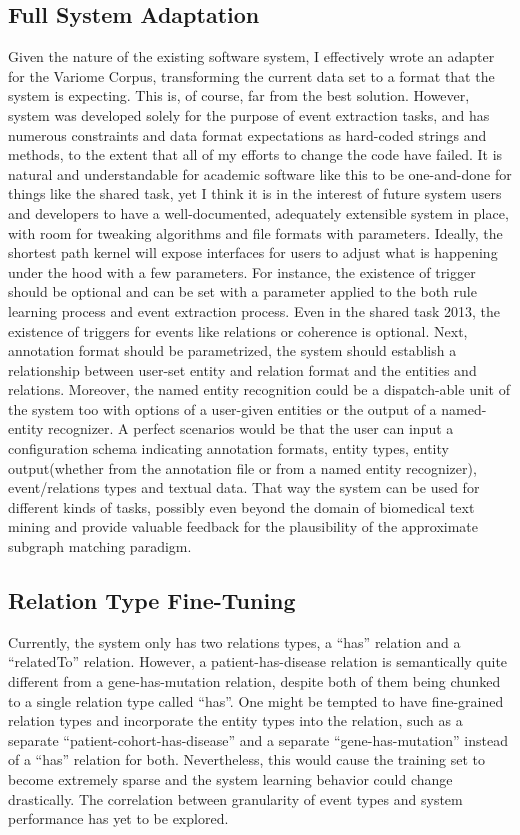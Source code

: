 \subsection{Full System Adaptation}
Given the nature of the existing software system, I effectively wrote an adapter for the Variome Corpus, transforming the current data set to a format that the system is expecting. This is, of course, far from the best solution. However, system was developed solely for the purpose of event extraction tasks, and has numerous constraints and data format expectations as hard-coded strings and methods, to the extent that all of my efforts to change the code have failed. It is natural and understandable for academic software like this to be one-and-done for things like the shared task, yet I think it is in the interest of future system users and developers to have a well-documented, adequately extensible system in place, with room for tweaking algorithms and file formats with parameters. Ideally, the shortest path kernel will expose interfaces for users to adjust what is happening under the hood with a few parameters. For instance, the existence of trigger should be optional and can be set with a parameter applied to the both rule learning process and event extraction process. Even in the shared task 2013, the existence of triggers for events like relations or coherence is optional. Next, annotation format should be parametrized, the system should establish a relationship between user-set entity and relation format and the entities and relations. Moreover, the named entity recognition could be a dispatch-able unit of the system too with options of a user-given entities or the output of a named-entity recognizer. A perfect scenarios would be that the user can input a configuration schema indicating annotation formats, entity types, entity output(whether from the annotation file or from a named entity recognizer), event/relations types and textual data. That way the system can be used for different kinds of tasks, possibly even beyond the domain of biomedical text mining and provide valuable feedback for the plausibility of the approximate subgraph matching paradigm.   
\subsection{Relation Type Fine-Tuning}
Currently, the system only has two relations types, a ``has'' relation and a ``relatedTo'' relation. However, a patient-has-disease relation is semantically quite different from a gene-has-mutation relation, despite both of them being chunked to a single relation type called ``has''. One might be tempted to have fine-grained relation types and incorporate the entity types into the relation, such as a separate ``patient-cohort-has-disease'' and a separate  ``gene-has-mutation'' instead of a ``has'' relation for both. Nevertheless, this would cause the training set to become extremely sparse and the system learning behavior could change drastically. The correlation between granularity of event types and system performance has yet to be explored.  
